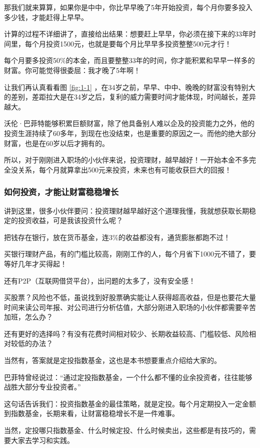 那我们就来算算，如果你是中中，你比早早晚了5年开始投资，每个月你要多投入多少钱，才能赶得上早早。

计算的过程不详细讲了，直接给出结果：想要赶上早早，你必须在接下来的33年时间里，每个月投资1500元，也就是要每个月比早早多投资整整500元才行！

每个月要多投资50\%的本金，而且要整整33年的时间，你才能积累和早早一样多的财富。你可能觉得很委屈：我才晚了5年啊！

让我们再认真看看图 \ref{fig:1-1} ，在34岁之前，早早、中中、晚晚的财富没有特别大的差别，差距拉大是在34岁之后，复利的威力需要时间才能体现，时间越长，差异越大。

沃伦·巴菲特能够积累巨额财富，除了他具备别人难以企及的投资能力之外，他的投资生涯持续了60多年，到现在也没结束，也是重要的原因之一。而他的绝大部分财富，也是在60岁以后才拥有的。

所以，对于刚刚进入职场的小伙伴来说，投资理财，越早越好！一开始本金不多完全没关系，每个月就算拿出500元来投资，未来也有可能收获巨大的回报！

\subsubsection{如何投资，才能让财富稳稳增长}

讲到这里，很多小伙伴要问：投资理财越早越好这个道理我懂，我就想获取长期稳定的投资收益，可是我该投资什么呢？

把钱存在银行，放在货币基金，连3\%的收益都没有，通货膨胀都跑不过！

买银行理财产品，有的门槛比较高，刚刚工作的人，每个月省下1000元不错了，要等好几年才买得起！

还有P2P（互联网借贷平台），出问题的太多了，没有安全感！

买股票？风险也不低，虽说找到好股票确实能让人获得超高收益，但是也要花大量时间来读公司年报、对公司进行分析估值，大部分刚进入职场的小伙伴都需要辛苦加班，怎么办？

还有更好的选择吗？有没有花费时间相对较少、长期收益较高、门槛较低、风险相对较低的办法？

当然有，答案就是定投指数基金，这也是本书想要重点介绍给大家的。

巴菲特曾经说过：“通过定投指数基金，一个什么都不懂的业余投资者，往往能够战胜大部分专业投资者。”

这句话告诉我们：投资指数基金的最佳策略，就是定投。每个月定期投入一定金额到指数基金，长期来看，让财富稳稳增长不是一件难事。

当然，定投哪只指数基金、什么时候定投、什么时候卖出，这些都是有技巧的，需要大家去学习和实践。

